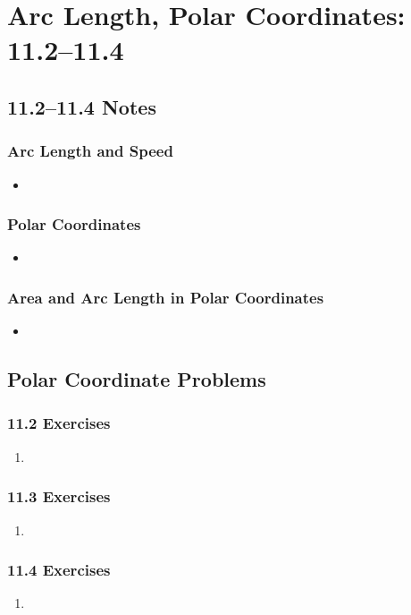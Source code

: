 \chapter{Arc Length, Polar Coordinates: 11.2--11.4}
\section{11.2--11.4 Notes}

\subsection{Arc Length and Speed}
\begin{itemize}
  \item
\end{itemize}

\subsection{Polar Coordinates}
\begin{itemize}
  \item
\end{itemize}

\subsection{Area and Arc Length in Polar Coordinates}
\begin{itemize}
  \item
\end{itemize}

\section{Polar Coordinate Problems}

\subsection{11.2 Exercises}
\begin{enumerate}[itemsep=3em]
  \item
\end{enumerate}

\subsection{11.3 Exercises}
\begin{enumerate}[itemsep=3em]
  \item
\end{enumerate}

\subsection{11.4 Exercises}
\begin{enumerate}[itemsep=3em]
  \item
\end{enumerate}
